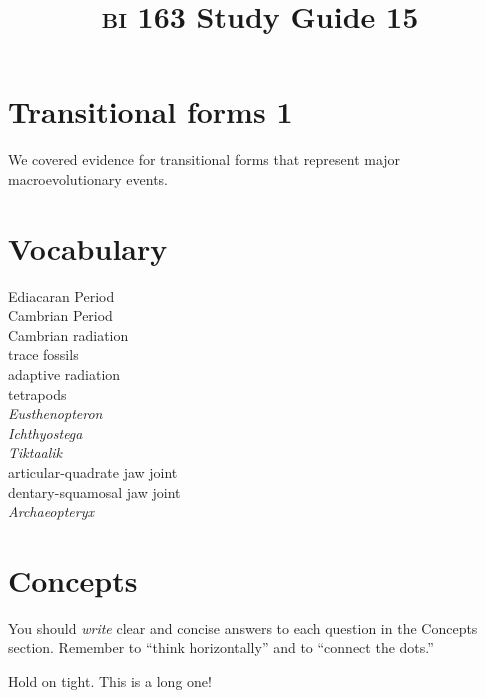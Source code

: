 \documentclass[letterpaper]{tufte-handout}
\title{{\scshape bi} 163 Study Guide 15}
\date{} %
\begin{document}
\maketitle	%

\section*{Transitional forms 1}

We covered evidence for transitional forms that represent major macroevolutionary events.

\section*{Vocabulary}

\vspace{-1\baselineskip}
\begin{multicols}{2}
Ediacaran Period\\
Cambrian Period\\
Cambrian radiation\\
trace fossils \\
adaptive radiation \\
tetrapods \\
\textit{Eusthenopteron} \\
\textit{Ichthyostega} \\
\textit{Tiktaalik} \\
articular-quadrate jaw joint \\
dentary-squamosal jaw joint\\
\textit{Archaeopteryx} \\
\end{multicols}

\section*{Concepts}

You should \emph{write} clear and concise answers to each question in the Concepts section.  Remember to ``think horizontally'' and to ``connect the dots.'' \vspace*{\baselineskip}

Hold on tight. This is a long one!
\end{document}
